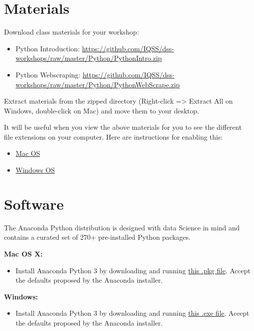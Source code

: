 \documentclass[]{book}
\providecommand{\tightlist}{%
  \setlength{\itemsep}{0pt}\setlength{\parskip}{0pt}}
\begin{document}
\hypertarget{materials-1}{%
\section{Materials}\label{materials-1}}

Download class materials for your workshop:

\begin{itemize}
\tightlist
\item
  Python Introduction: \url{https://github.com/IQSS/dss-workshops/raw/master/Python/PythonIntro.zip}
\item
  Python Webscraping: \url{https://github.com/IQSS/dss-workshops/raw/master/Python/PythonWebScrape.zip}
\end{itemize}

Extract materials from the zipped directory (Right-click =\textgreater{} Extract All on Windows, double-click on Mac) and move them to your desktop.

It will be useful when you view the above materials for you to see the different file extensions on your computer. Here are instructions for enabling this:

\begin{itemize}
\tightlist
\item
  \href{https://support.apple.com/guide/mac-help/show-or-hide-filename-extensions-on-mac-mchlp2304/mac}{Mac OS}
\item
  \href{http://kb.winzip.com/kb/entry/26/}{Windows OS}
\end{itemize}

\hypertarget{software-1}{%
\section{Software}\label{software-1}}

The Anaconda Python distribution is designed with data Science in mind and contains a curated set of 270+ pre-installed Python packages.

\textbf{Mac OS X:}

\begin{itemize}
\tightlist
\item
  Install Anaconda Python 3 by downloading and running \href{https://repo.anaconda.com/archive/Anaconda3-2019.10-MacOSX-x86_64.pkg}{this .pkg file}. Accept the defaults proposed by the Anaconda installer.
\end{itemize}

\textbf{Windows:}

\begin{itemize}
\tightlist
\item
  Install Anaconda Python 3 by downloading and running \href{https://repo.anaconda.com/archive/Anaconda3-2019.10-Windows-x86_64.exe}{this .exe file}. Accept the defaults proposed by the Anaconda installer.
\end{itemize}
\end{document}
